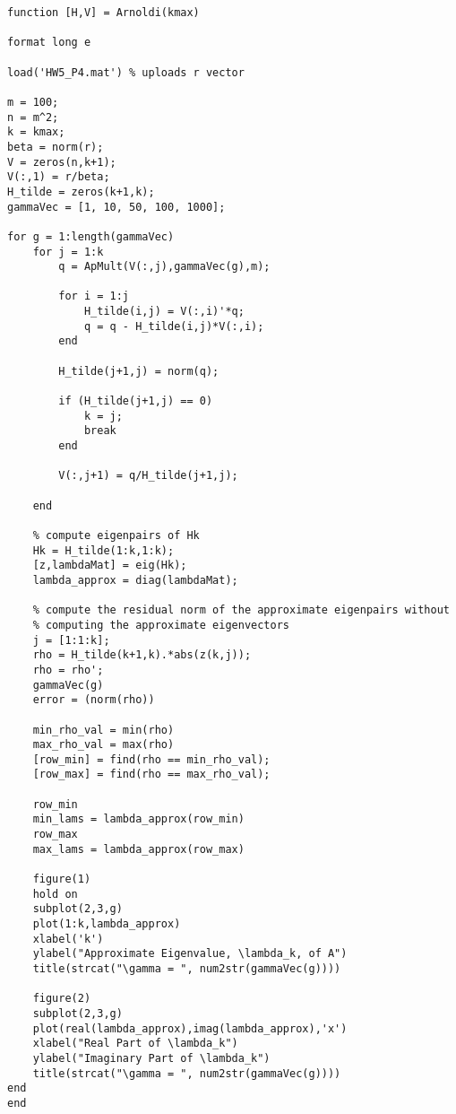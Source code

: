 \documentclass[12pt]{article}
\begin{document}
\lstset{language=matlab,frame=single}
\begin{lstlisting}[caption=Matlab Code to Compute Approximate Eigenpairs using the Arnoldi Process]
function [H,V] = Arnoldi(kmax)

format long e

load('HW5_P4.mat') % uploads r vector

m = 100;
n = m^2;
k = kmax;
beta = norm(r);
V = zeros(n,k+1);
V(:,1) = r/beta;
H_tilde = zeros(k+1,k);
gammaVec = [1, 10, 50, 100, 1000];

for g = 1:length(gammaVec)
    for j = 1:k
        q = ApMult(V(:,j),gammaVec(g),m);

        for i = 1:j
            H_tilde(i,j) = V(:,i)'*q;
            q = q - H_tilde(i,j)*V(:,i);
        end

        H_tilde(j+1,j) = norm(q);

        if (H_tilde(j+1,j) == 0)
            k = j;
            break
        end

        V(:,j+1) = q/H_tilde(j+1,j);

    end

    % compute eigenpairs of Hk
    Hk = H_tilde(1:k,1:k);
    [z,lambdaMat] = eig(Hk);
    lambda_approx = diag(lambdaMat);

    % compute the residual norm of the approximate eigenpairs without 
    % computing the approximate eigenvectors
    j = [1:1:k];
    rho = H_tilde(k+1,k).*abs(z(k,j));
    rho = rho';
    gammaVec(g)
    error = (norm(rho))

    min_rho_val = min(rho)
    max_rho_val = max(rho)
    [row_min] = find(rho == min_rho_val);
    [row_max] = find(rho == max_rho_val);
    
    row_min
    min_lams = lambda_approx(row_min)
    row_max
    max_lams = lambda_approx(row_max)

    figure(1)
    hold on
    subplot(2,3,g)
    plot(1:k,lambda_approx)
    xlabel('k')
    ylabel("Approximate Eigenvalue, \lambda_k, of A")
    title(strcat("\gamma = ", num2str(gammaVec(g))))
    
    figure(2)
    subplot(2,3,g)
    plot(real(lambda_approx),imag(lambda_approx),'x')
    xlabel("Real Part of \lambda_k")
    ylabel("Imaginary Part of \lambda_k")
    title(strcat("\gamma = ", num2str(gammaVec(g))))
end
end
\end{lstlisting}
\end{document}
